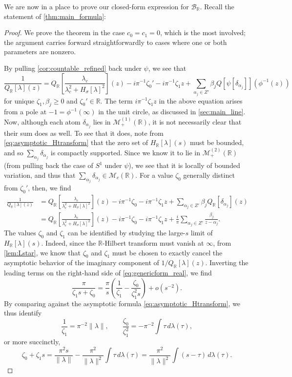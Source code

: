 \documentclass{cams-l} %
\newcommand{\RR}{\mathbb R}
\newcommand{\cM}{\mathcal M}
\newcommand{\cB}{\mathcal B}
\theoremstyle{definition}
\theoremstyle{remark}
\numberwithin{equation}{section}
\begin{document}
We are now in a place to prove our closed-form expression for $\cB_\RR$. Recall the statement of \cref{thm:main_formula}:
\thmmainformula*
\begin{proof}
    We prove the theorem in the case $c_0=c_1=0$, which is the most involved; the argument carries forward straightforwardly to cases where one or both parameters are nonzero.
    
    By pulling \cref{cor:countable_refined} back under $\psi$, we see that
    \[\frac{1}{Q_\RR[\lambda](z)} = Q_{\RR}\left[\frac{\lambda_c}{\lambda_c^2 + H_\sigma[\lambda]^2}\right](z) - i\pi^{-1}\zeta_0' - i\pi^{-1}\zeta_1 z +  \sum_{\alpha_j\in Z'} \beta_j Q[\psi[\delta_{\alpha_j}]](\phi^{-1}(z))\]
    for unique $\zeta_1,\beta_j\geq 0$ and $\zeta_0'\in\RR$. The term $i\pi^{-1}\zeta_1 z$ in the above equation arises from a pole at $-1 = \phi^{-1}(\infty)$ in the unit circle, as discussed in \cref{sec:main_line}. Now, although each atom $\delta_{\alpha_j}$ lies in $\cM_+^{(1)}(\RR)$, it is not necessarily clear that their sum does as well. To see that it does, note from \cref{eq:asymptotic_Htransform} that the zero set of $H_\RR[\lambda](s)$ must be bounded, and so $\sum_{\alpha_j}\delta_{\alpha_j}$ is compactly supported. Since we know it to lie in $\cM_+^{(2)}(\RR)$ (from pulling back the case of $S^1$ under $\psi$), we see that it is locally of bounded variation, and thus that $\sum_{\alpha_j}\delta_{\alpha_j}\in\cM_c(\RR)$. For a value $\zeta_0$ generally distinct from $\zeta_0'$, then, we find
    \begin{equation}\label{eq:genericform_real}
    \begin{aligned}
        \frac{1}{Q_\RR[\lambda](z)} &= Q_{\RR}\left[\frac{\lambda_c}{\lambda_c^2 + H_\sigma[\lambda]^2}\right](z) - i\pi^{-1}\zeta_0 - i\pi^{-1}\zeta_1 z +  \sum_{\alpha_j\in Z'} \beta_j Q_\RR[\delta_{\alpha_j}](z)\\
        &= Q_{\RR}\left[\frac{\lambda_c}{\lambda_c^2 + H_\sigma[\lambda]^2}\right](z) - i\pi^{-1}\zeta_0 - i\pi^{-1}\zeta_1 z +  \frac{i}{\pi}\sum_{\alpha_j\in Z'} \frac{\beta_j}{z-\alpha_j}.
    \end{aligned}
    \end{equation}
    The values $\zeta_0$ and $\zeta_1$ can be identified by studying the large-$s$ limit of $H_{\RR}[\lambda](s)$. Indeed, since the $\RR$-Hilbert transform must vanish at $\infty$, from \cref{lem:Lstar}, we know that $\zeta_0$ and $\zeta_1$ must be chosen to exactly cancel the asymptotic behavior of the imaginary component of $1/Q_\RR[\lambda](z)$. Inverting the leading terms on the right-hand side of \cref{eq:genericform_real}, we find
    \[\frac{\pi}{\zeta_1 s + \zeta_0} = \frac{\pi}{s}\left(\frac{1}{\zeta_1} - \frac{\zeta_0}{\zeta_1^2s}\right) + o(s^{-2}).\]
    By comparing against the asymptotic formula \cref{eq:asymptotic_Htransform}, we thus identify
    \[\frac{1}{\zeta_1} = \pi^{-2}\|\lambda\|,\qquad \frac{\zeta_0}{\zeta_1^2} = -\pi^{-2}\int \tau\,d\lambda(\tau),\]
    or more succinctly,
    \[\zeta_0 + \zeta_1s = \frac{\pi^2 s}{\|\lambda\|} - \frac{\pi^2}{\|\lambda\|^2}\int \tau\,d\lambda(\tau) = \frac{\pi^2}{\|\lambda\|^2}\int(s-\tau)\,d\lambda(\tau).\]
    

\end{proof}
\end{document}
